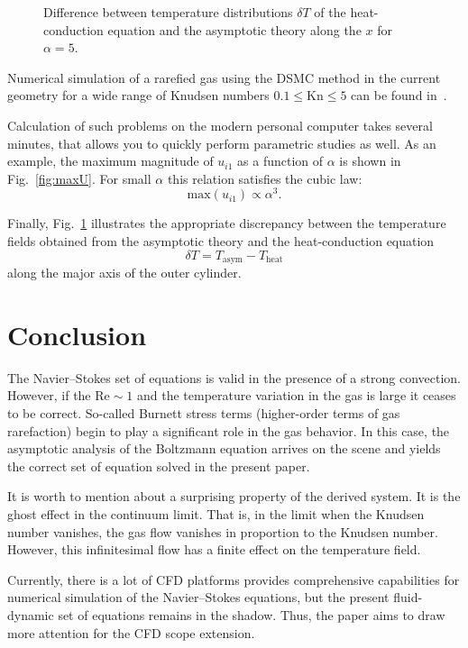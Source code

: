\documentclass[smallextended, referee]{svjour3} %
\newcommand{\Kn}{\mathrm{Kn}}
\begin{document}
\begin{figure}[ht]
\begin{minipage}{.48\textwidth}
		\caption{Difference between temperature distributions \(\delta T\) of the heat-conduction equation
			and the asymptotic theory along the \(x\) for \(\alpha = 5\).}
		\label{fig:deltaT}
	\end{minipage}
\end{figure}

Numerical simulation of a rarefied gas using the DSMC method in the current geometry
for a wide range of Knudsen numbers \(0.1\le\Kn\le5\) can be found in~\cite{SoneCoaxial}.

Calculation of such problems on the modern personal computer takes several minutes,
that allows you to quickly perform parametric studies as well. As an example,
the maximum magnitude of \(u_{i1}\) as a function of \(\alpha\) is shown in Fig.~\ref{fig:maxU}.
For small \(\alpha\) this relation satisfies the cubic law:
\begin{equation}
	\mathrm{max}(u_{i1}) \propto \alpha^3.
\end{equation}

Finally, Fig.~\ref{fig:deltaT} illustrates the appropriate discrepancy between the temperature fields
obtained from the asymptotic theory and the heat-conduction equation
\[ \delta T = T_\mathrm{asym} - T_\mathrm{heat} \]
along the major axis of the outer cylinder.

\section{Conclusion}

The Navier--Stokes set of equations is valid in the presence of a strong convection.
However, if the \(\mathrm{Re} \sim 1\) and the temperature variation in the gas is large
it ceases to be correct. So-called Burnett stress terms (higher-order terms of gas rarefaction)
begin to play a significant role in the gas behavior.
In this case, the asymptotic analysis of the Boltzmann equation arrives on the scene and yields
the correct set of equation solved in the present paper.

It is worth to mention about a surprising property of the derived system. It is the ghost effect
in the continuum limit. That is, in the limit when the Knudsen number vanishes,
the gas flow vanishes in proportion to the Knudsen number. However, this infinitesimal flow
has a finite effect on the temperature field.

Currently, there is a lot of CFD platforms provides comprehensive capabilities for
numerical simulation of the Navier--Stokes equations, but the present fluid-dynamic
set of equations remains in the shadow. Thus, the paper aims to
draw more attention for the CFD scope extension.
\end{document}

